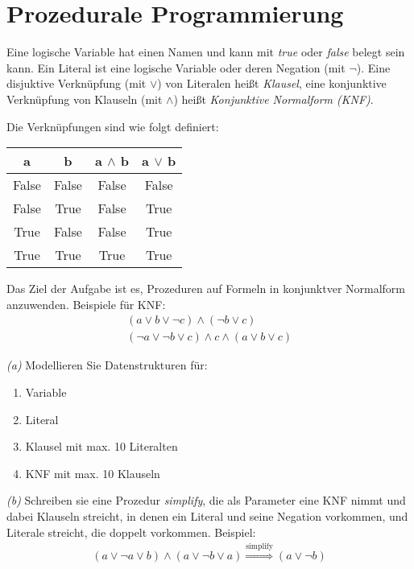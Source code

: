 \documentclass[11pt,a4paper,oneside,ngerman]{scrbook}
\begin{document}
\newpage

\section{Prozedurale Programmierung}

Eine logische Variable hat einen Namen und kann mit \emph{true} oder \emph{false} belegt sein kann. Ein Literal ist eine logische Variable oder deren Negation (mit $\neg$). Eine disjuktive Verknüpfung (mit $\lor$) von Literalen heißt \emph{Klausel}, eine konjunktive Verknüpfung von Klauseln (mit $\land$) heißt \emph{Konjunktive Normalform (KNF)}.


Die Verknüpfungen sind wie folgt definiert:


\begin{tabular}[ht]{|c|c|c|c|} %
  \hline
  a & b & a $\land$ b & a $\lor$ b\\
  \hline
  False & False & False & False\\
  False & True & False & True\\
  True & False & False & True\\
  True & True & True & True\\
  \hline
\end{tabular}


Das Ziel der Aufgabe ist es, Prozeduren auf Formeln in konjunktver Normalform anzuwenden. Beispiele für KNF:
\begin{gather*}
  (a \lor b \lor \neg c) \land ( \neg b \lor c) \\
  (\neg a \lor \neg b \lor c ) \land c \land (a \lor b \lor c)
\end{gather*}

\emph{(a)} Modellieren Sie Datenstrukturen für:
\begin{enumerate}
  \item Variable
  \item Literal
  \item Klausel mit max. 10 Literalten
  \item KNF mit max. 10 Klauseln
\end{enumerate}

\emph{(b)} Schreiben sie eine Prozedur \emph{simplify}, die als Parameter eine KNF nimmt und dabei Klauseln streicht, in denen ein Literal und seine Negation vorkommen, und Literale streicht, die doppelt vorkommen. Beispiel:
\begin{gather*}
  (a \lor \neg a \lor b) \land (a \lor \neg b \lor a) \overset{\text{simplify}}\Rightarrow (a \lor \neg b)
\end{gather*}
\end{document}
